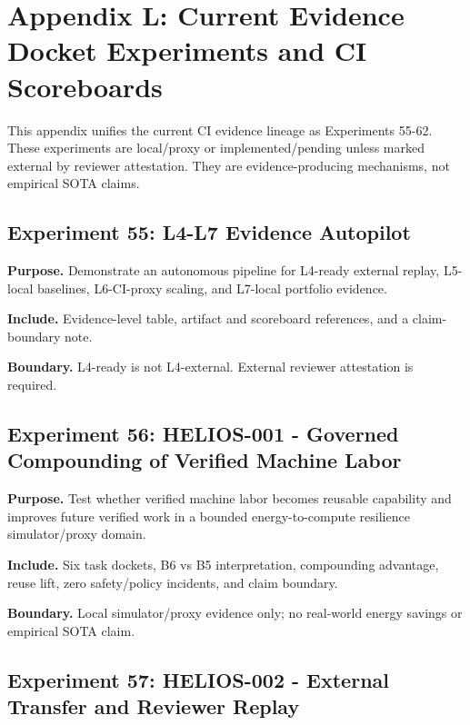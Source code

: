 \section{Appendix L: Current Evidence Docket Experiments and CI
Scoreboards}\label{appendix-l-current-evidence-docket-experiments-and-ci-scoreboards}

This appendix unifies the current CI evidence lineage as Experiments
55-62. These experiments are local/proxy or implemented/pending unless
marked external by reviewer attestation. They are evidence-producing
mechanisms, not empirical SOTA claims.

\subsection{Experiment 55: L4-L7 Evidence
Autopilot}\label{experiment-55-l4-l7-evidence-autopilot}

\textbf{Purpose.} Demonstrate an autonomous pipeline for L4-ready
external replay, L5-local baselines, L6-CI-proxy scaling, and L7-local
portfolio evidence.

\textbf{Include.} Evidence-level table, artifact and scoreboard
references, and a claim-boundary note.

\textbf{Boundary.} L4-ready is not L4-external. External reviewer
attestation is required.

\subsection{Experiment 56: HELIOS-001 - Governed Compounding of Verified
Machine
Labor}\label{experiment-56-helios-001---governed-compounding-of-verified-machine-labor}

\textbf{Purpose.} Test whether verified machine labor becomes reusable
capability and improves future verified work in a bounded
energy-to-compute resilience simulator/proxy domain.

\textbf{Include.} Six task dockets, B6 vs B5 interpretation, compounding
advantage, reuse lift, zero safety/policy incidents, and claim boundary.

\textbf{Boundary.} Local simulator/proxy evidence only; no real-world
energy savings or empirical SOTA claim.

\subsection{Experiment 57: HELIOS-002 - External Transfer and Reviewer
Replay}\label{experiment-57-helios-002---external-transfer-and-reviewer-replay}

